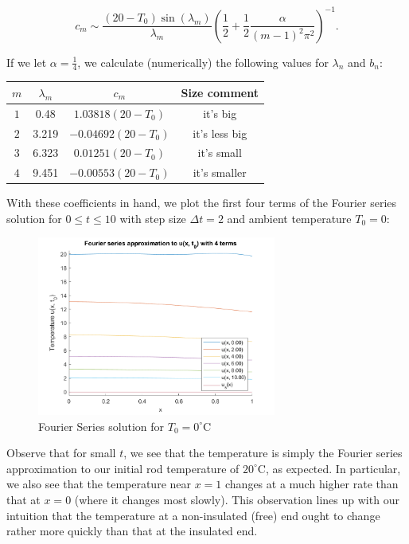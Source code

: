 \begin{solution}
    $$
        c_m \sim \frac{(20 - T_0) \sin{(\lambda_m)}}{\lambda_m} \left(\frac{1}{2} + \frac{1}{2}\frac{\alpha}{(m-1)^2 \pi^2} \right)^{-1}.
    $$

    If we let $\alpha = \frac{1}{4}$, we calculate (numerically) the following values for $\lambda_n$ and $b_n$: 

    \begin{center}
        \begin{tabular}{ ||c c c c|| } 
            \hline
            $m$ & $\lambda_m$ & $c_m$ & Size comment  \\ [0.5ex] 
            \hline\hline
            $1$ & 0.48        & $1.03818 (20 - T_0)$  & it's big \\ 
            \hline
            $2$ & 3.219       & $-0.04692 (20 - T_0)$ & it's less big \\ 
            \hline
            $3$ & 6.323       & $0.01251 (20 - T_0)$  & it's small \\ 
            \hline
            $4$ & 9.451       & $-0.00553 (20 - T_0)$ & it's smaller \\ [1ex]
        \hline
        \end{tabular}
    \end{center}

    \pagebreak
    With these coefficients in hand, we plot the first four terms of the Fourier series solution for $0 \le t \le 10$
    with step size $\Delta t = 2$ and ambient temperature $T_0 = 0$:

    \begin{figure}[h]
        \centering
        \includegraphics[width=0.7\textwidth]{problem1_fourier_series_solution_4_terms_t0_0.png}
        \caption{Fourier Series solution for $T_0 = 0^{\circ}$C}
    \end{figure}

    Observe that for small $t$, we see that the temperature is simply the Fourier series approximation to our
    initial rod temperature of $20^{\circ}$C, as expected.  In particular, we also see that the temperature 
    near $x = 1$ changes at a much higher rate than that at $x = 0$ (where it changes most slowly). This 
    observation lines up with our intuition that the temperature at a non-insulated (free) end ought to change
    rather more quickly than that at the insulated end.
    

\end{solution}
